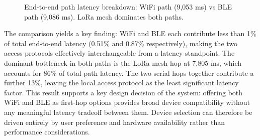 \documentclass[conference]{IEEEtran}
\begin{document}
\begin{figure}[h]
\centering
{}
\caption{End-to-end path latency breakdown: WiFi path (9,053 ms) vs BLE path (9,086 ms). LoRa mesh dominates both paths.}
\label{fig:pathcomp}
\end{figure}

The comparison yields a key finding: WiFi and BLE each contribute less than 1\% of total end-to-end latency (0.51\% and 0.87\% respectively), making the two access protocols effectively interchangeable from a latency standpoint. The dominant bottleneck in both paths is the LoRa mesh hop at 7,805 ms, which accounts for 86\% of total path latency. The two serial hops together contribute a further 13\%, leaving the local access protocol as the least significant latency factor. This result supports a key design decision of the system: offering both WiFi and BLE as first-hop options provides broad device compatibility without any meaningful latency tradeoff between them. Device selection can therefore be driven entirely by user preference and hardware availability rather than performance considerations.
\end{document}
